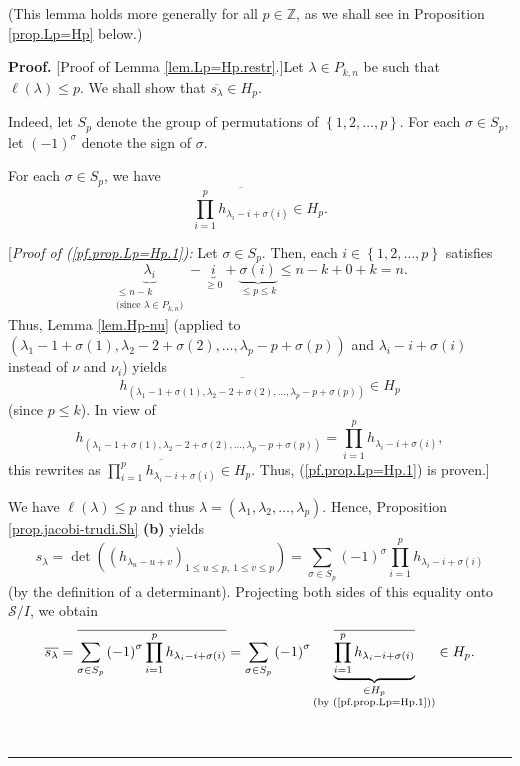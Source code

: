 \documentclass[numbers=enddot,12pt,final,onecolumn,notitlepage]{scrartcl}%
\theoremstyle{definition}
\newenvironment{proof}[1][Proof]{\noindent\textbf{#1.} }{\ \rule{0.5em}{0.5em}}
\let\sumnonlimits\sum
\let\prodnonlimits\prod
\renewcommand{\sum}{\sumnonlimits\limits}
\renewcommand{\prod}{\prodnonlimits\limits}
\begin{document}
(This lemma holds more generally for all $p\in\mathbb{Z}$, as we shall see in
Proposition \ref{prop.Lp=Hp} below.)

\begin{proof}
[Proof of Lemma \ref{lem.Lp=Hp.restr}.]Let $\lambda\in P_{k,n}$ be such that
$\ell\left(  \lambda\right)  \leq p$. We shall show that $\overline
{s_{\lambda}}\in H_{p}$.

Indeed, let $S_{p}$ denote the group of permutations of $\left\{
1,2,\ldots,p\right\}  $. For each $\sigma\in S_{p}$, let $\left(  -1\right)
^{\sigma}$ denote the sign of $\sigma$.

For each $\sigma\in S_{p}$, we have%
\begin{equation}
\overline{\prod_{i=1}^{p}h_{\lambda_{i}-i+\sigma\left(  i\right)  }}\in H_{p}.
\label{pf.prop.Lp=Hp.1}%
\end{equation}


[\textit{Proof of (\ref{pf.prop.Lp=Hp.1}):} Let $\sigma\in S_{p}$. Then, each
$i\in\left\{  1,2,\ldots,p\right\}  $ satisfies
\[
\underbrace{\lambda_{i}}_{\substack{\leq n-k\\\text{(since }\lambda\in
P_{k,n}\text{)}}}-\underbrace{i}_{\geq0}+\underbrace{\sigma\left(  i\right)
}_{\leq p\leq k}\leq n-k+0+k=n.
\]
Thus, Lemma \ref{lem.Hp-nu} (applied to $\left(  \lambda_{1}-1+\sigma\left(
1\right)  ,\lambda_{2}-2+\sigma\left(  2\right)  ,\ldots,\lambda_{p}%
-p+\sigma\left(  p\right)  \right)  $ and $\lambda_{i}-i+\sigma\left(
i\right)  $ instead of $\nu$ and $\nu_{i}$) yields
\[
\overline{h_{\left(  \lambda_{1}-1+\sigma\left(  1\right)  ,\lambda
_{2}-2+\sigma\left(  2\right)  ,\ldots,\lambda_{p}-p+\sigma\left(  p\right)
\right)  }}\in H_{p}%
\]
(since $p\leq k$). In view of%
\[
h_{\left(  \lambda_{1}-1+\sigma\left(  1\right)  ,\lambda_{2}-2+\sigma\left(
2\right)  ,\ldots,\lambda_{p}-p+\sigma\left(  p\right)  \right)  }=\prod
_{i=1}^{p}h_{\lambda_{i}-i+\sigma\left(  i\right)  },
\]
this rewrites as $\overline{\prod_{i=1}^{p}h_{\lambda_{i}-i+\sigma\left(
i\right)  }}\in H_{p}$. Thus, (\ref{pf.prop.Lp=Hp.1}) is proven.]

We have $\ell\left(  \lambda\right)  \leq p$ and thus $\lambda=\left(
\lambda_{1},\lambda_{2},\ldots,\lambda_{p}\right)  $. Hence, Proposition
\ref{prop.jacobi-trudi.Sh} \textbf{(b)} yields%
\[
s_{\lambda}=\det\left(  \left(  h_{\lambda_{u}-u+v}\right)  _{1\leq u\leq
p,\ 1\leq v\leq p}\right)  =\sum_{\sigma\in S_{p}}\left(  -1\right)  ^{\sigma
}\prod_{i=1}^{p}h_{\lambda_{i}-i+\sigma\left(  i\right)  }%
\]
(by the definition of a determinant). Projecting both sides of this equality
onto $\mathcal{S}/I$, we obtain%
\[
\overline{s_{\lambda}}=\overline{\sum_{\sigma\in S_{p}}\left(  -1\right)
^{\sigma}\prod_{i=1}^{p}h_{\lambda_{i}-i+\sigma\left(  i\right)  }}%
=\sum_{\sigma\in S_{p}}\left(  -1\right)  ^{\sigma}\underbrace{\overline
{\prod_{i=1}^{p}h_{\lambda_{i}-i+\sigma\left(  i\right)  }}}_{\substack{\in
H_{p}\\\text{(by (\ref{pf.prop.Lp=Hp.1}))}}}\in H_{p}.
\]



\end{proof}
\end{document}
